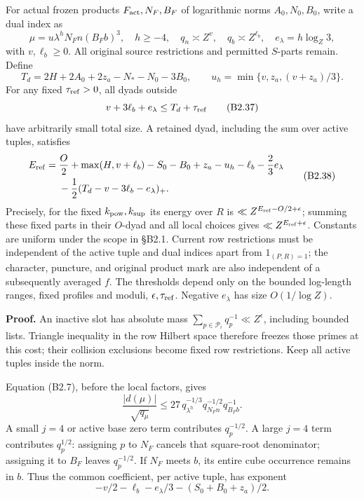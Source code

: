 \documentclass[11pt,a4paper]{article}
\begin{document}
For actual frozen products \(F_{\rm act},\allowbreak{}N_F,\allowbreak{}B_F\) of logarithmic norms
\(A_0,\allowbreak{}N_0,\allowbreak{}B_0\), write a dual index as \[
\mu=u\lambda^hN_Fn(B_Fb)^3,\quad h\ge-4,\quad
q_n\asymp Z^v,\quad q_b\asymp Z^{\ell_b},\quad
e_\lambda=h\log_Z3,
\] with \(v,\allowbreak{}\ell_b\ge0\). All original source restrictions and permitted
\(S\)-parts remain. Define \[
T_d=2H+2A_0+2z_a-N_*-N_0-3B_0,\qquad
u_h=\min\{v,z_a,(v+z_a)/3\}.
\tag{B2.36}
\] For any fixed \(\tau_{\rm ref}>0\), all dyads outside \[
v+3\ell_b+e_\lambda\le T_d+\tau_{\rm ref}
\tag{B2.37}
\] have arbitrarily small total size. A retained dyad, including the sum
over active tuples, satisfies \[
\begin{aligned}
E_{\rm ref}
={}&\frac O2+\max(H,v+\ell_b)-S_0-B_0+z_a-u_h-\ell_b-\frac23e_\lambda\\
&-\frac12(T_d-v-3\ell_b-e_\lambda)_+.
\end{aligned}
\tag{B2.38}
\] Precisely, for the fixed \(k_{\rm pow},\allowbreak{}k_{\rm sup}\) its energy over
\(R\) is \(\ll Z^{E_{\rm ref}-O/2+\epsilon}\); summing these fixed parts
in their \(O\)-dyad and all local choices gives
\(\ll Z^{E_{\rm ref}+\epsilon}\). Constants are uniform under the scope
in §B2.1. Current row restrictions must be independent of the active
tuple and dual indices apart from \(1_{(P,\allowbreak{}R)=1}\); the character,
puncture, and original product mark are also independent of a
subsequently averaged \(f\). The thresholds depend only on the bounded
log-length ranges, fixed profiles and moduli,
\(\epsilon,\allowbreak{}\tau_{\rm ref}\). Negative \(e_\lambda\) has size
\(O(1/\log Z)\).

\textbf{Proof.} An inactive slot has absolute mass
\(\sum_{p\in\mathcal P_i}q_p^{-1}\ll Z^\epsilon\), including bounded
lists. Triangle inequality in the row Hilbert space therefore freezes
those primes at this cost; their collision exclusions become fixed row
restrictions. Keep all active tuples inside the norm.

Equation (B2.7), before the local factors, gives \[
\frac{|d(\mu)|}{\sqrt{q_\mu}}
\le27\,q_{\lambda^h}^{-1/3}q_{N_Fn}^{-1/2}q_{B_Fb}^{-1}.
\] A small \(j=4\) or active base zero term contributes \(q_p^{-1/2}\).
A large \(j=4\) term contributes \(q_p^{1/2}\): assigning \(p\) to
\(N_F\) cancels that square-root denominator; assigning it to \(B_F\)
leaves \(q_p^{-1/2}\). If \(N_F\) meets \(b\), its entire cube
occurrence remains in \(b\). Thus the common coefficient, per active
tuple, has exponent \[
-v/2-\ell_b-e_\lambda/3-(S_0+B_0+z_a)/2.
\tag{B2.39}
\]
\end{document}
